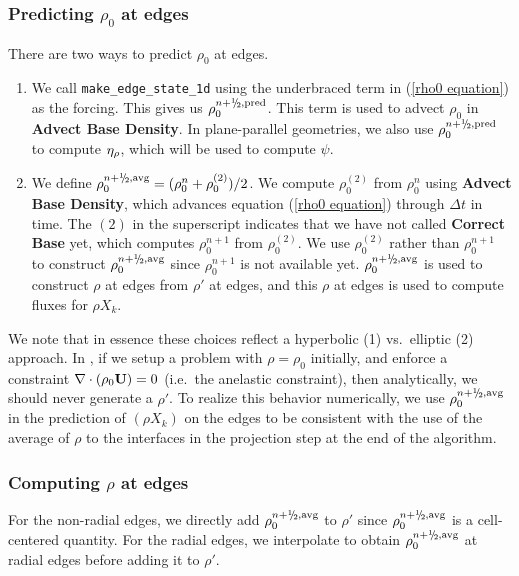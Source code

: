 \subsubsection{Predicting $\rho_0$ at edges}\label{Predicting rho0 at edges}
There are two ways to predict $\rho_0$ at edges.
\begin{enumerate}

\item We call {\tt make\_edge\_state\_1d} using the underbraced term
in (\ref{rho0 equation}) as the forcing.  This gives us
$\rho_0^{n+\myhalf,{\rm pred}}$.  This term is used to advect $\rho_0$
in {\bf Advect Base Density}.  In plane-parallel geometries, we also use
$\rho_0^{n+\myhalf,{\rm pred}}$ to compute $\eta_{\rho}$, which will be used 
to compute $\psi$.

\item We define $\rho_0^{n+\myhalf,{\rm avg}} = (\rho_0^n +
\rho_0^{(2)})/2$.  We compute $\rho_0^{(2)}$ from $\rho_0^n$ using
{\bf Advect Base Density}, which advances equation (\ref{rho0 equation})
through $\Delta t$ in time.  The $(2)$ in the superscript indicates
that we have not called {\bf Correct Base} yet, which computes
$\rho_0^{n+1}$ from $\rho_0^{(2)}$.  We use $\rho_0^{(2)}$ rather than
$\rho_0^{n+1}$ to construct $\rho_0^{n+\myhalf,{\rm avg}}$ since $\rho_0^{n+1}$
is not available yet.  $\rho_0^{n+\myhalf,{\rm avg}}$ is used to construct 
$\rho$ at edges from $\rho'$ at edges, and
this $\rho$ at edges is used to compute fluxes for $\rho X_k$.
\end{enumerate}

We note that in essence these choices reflect a hyperbolic (1)
vs.\ elliptic (2) approach.  In \maestro, if we setup a problem with
$\rho = \rho_0$ initially, and enforce a constraint $\nabla \cdot
(\rho_0 {\bf U}) = 0$ (i.e.\ the anelastic constraint), then analytically,
we should never generate a $\rho'$.  To realize this behavior
numerically, we use $\rho_0^{n+\myhalf,{\rm avg}}$ in the prediction
of $(\rho X_k)$ on the edges to be consistent with the use of the
average of $\rho$ to the interfaces in the projection step at the end
of the algorithm.

\subsubsection{Computing $\rho$ at edges}\label{Computing rho at edges}
For the non-radial edges, we directly add $\rho_0^{n+\myhalf,{\rm avg}}$
to $\rho'$ since $\rho_0^{n+\myhalf,{\rm avg}}$ is a cell-centered
quantity.  For the radial edges, we interpolate to obtain
$\rho_0^{n+\myhalf,{\rm avg}}$ at radial edges before adding it to
$\rho'$.

